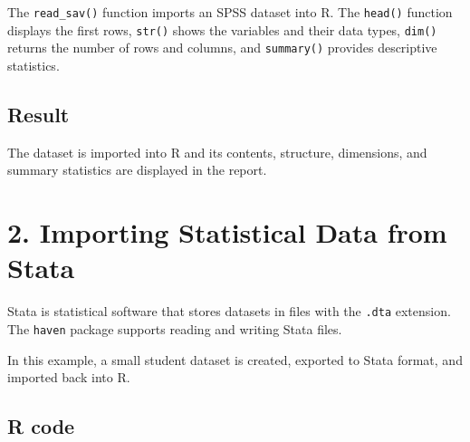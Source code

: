 \documentclass[
]{article}
\begin{document}
The \texttt{read\_sav()} function imports an SPSS dataset into R. The
\texttt{head()} function displays the first rows, \texttt{str()} shows
the variables and their data types, \texttt{dim()} returns the number of
rows and columns, and \texttt{summary()} provides descriptive
statistics.

\subsection{Result}\label{result}

The dataset is imported into R and its contents, structure, dimensions,
and summary statistics are displayed in the report.

\section{2. Importing Statistical Data from
Stata}\label{importing-statistical-data-from-stata}

Stata is statistical software that stores datasets in files with the
\texttt{.dta} extension. The \texttt{haven} package supports reading and
writing Stata files.

In this example, a small student dataset is created, exported to Stata
format, and imported back into R.

\subsection{R code}\label{r-code-1}
\end{document}
